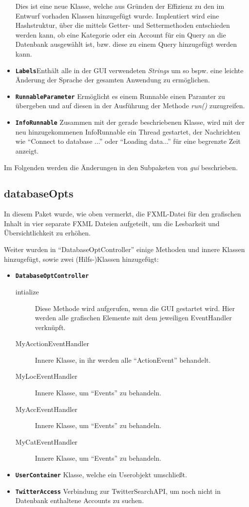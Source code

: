 \begin{itemize}
	Dies ist eine neue Klasse, welche aus Gründen der Effizienz zu den im Entwurf vorhaden Klassen hinzugefügt wurde. Implentiert wird eine Hashstruktur, über die mittels Getter- und Settermethoden entschieden werden kann, ob eine Kategorie oder ein Account für ein Query an die Datenbank ausgewählt ist, bzw. diese zu einem Query hinzugefügt werden kann.
	\item \textbf{\lstinline{Labels}}\quad Enthält alle in der GUI verwendeten \emph{Strings} um so bspw. eine leichte Änderung der Sprache der gesamten Anwendung zu ermöglichen.
	\item \textbf{\lstinline{RunnableParameter}} Ermöglicht es einem Runnable einen Paramter zu übergeben und auf diesen in der Ausführung der Methode \emph{run()} zuzugreifen.
	\item \textbf{\lstinline{InfoRunnable}} \quad Zusammen mit der gerade beschriebenen Klasse, wird mit der neu hinzugekommenen InfoRunnable ein Thread gestartet, der Nachrichten wie "`Connect to database ..."' oder "`Loading data..."' für eine begrenzte Zeit anzeigt.
\end{itemize}

Im Folgenden werden die Änderungen in den Subpaketen von \emph{gui} beschrieben.

\subsection{databaseOpts}
In diesem Paket wurde, wie oben vermerkt, die FXML-Datei für den grafischen Inhalt in vier separate FXML Dateien aufgeteilt, um die Lesbarkeit und Übersichtlichkeit zu erhöhen.


Weiter wurden in "`DatabaseOptController"' einige Methoden und innere Klassen hinzugefügt, sowie zwei (Hilfs-)Klassen hinzugefügt:
\begin{itemize}
	\item \textbf{\lstinline{DatabaseOptController}}
	\quad
	\begin{description}
		\item[intialize]
		\quad
		Diese Methode wird aufgerufen, wenn die GUI gestartet wird. Hier werden alle grafischen Elemente mit dem jeweiligen EventHandler verknüpft.
	
			\item[MyAcctionEventHandler] Innere Klasse, in ihr werden alle "`ActionEvent"' behandelt. 
			\item[MyLocEventHandler] Innere Klasse, um "`Events"' zu behandeln.
			\item[MyAccEventHandler] Innere Klasse, um "`Events"' zu behandeln.
			\item[MyCatEventHandler] Innere Klasse, um "`Events"' zu behandeln.
		\end{description}
	\item \textbf{\lstinline{UserContainer}} Klasse, welche ein Userobjekt umschließt.
	\item \textbf{\lstinline{TwitterAccess}} Verbindung zur TwitterSearchAPI, um noch nicht in Datenbank enthaltene Accounts zu suchen.
\end{itemize}
	
